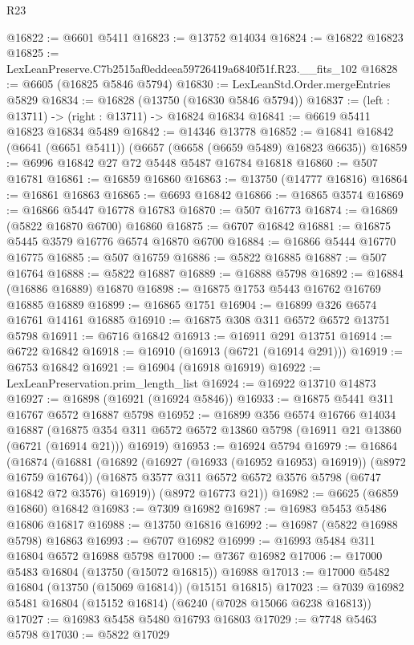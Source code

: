 \begin{lexlean}{R23}
\begin{coremodule}
@16822 := @6601 @5411
@16823 := @13752 @14034
@16824 := @16822 @16823
@16825 := LexLeanPreserve.C7b2515af0eddeea59726419a6840f51f.R23.__fits_102
@16828 := @6605 (@16825 @5846 @5794)
@16830 := LexLeanStd.Order.mergeEntries @5829
@16834 := @16828 (@13750 (@16830 @5846 @5794))
@16837 := (left : @13711) -> (right : @13711) -> @16824 @16834
@16841 := @6619 @5411 @16823 @16834 @5489
@16842 := @14346 @13778
@16852 := @16841 @16842 (@6641 (@6651 @5411)) (@6657 (@6658 (@6659 @5489) @16823 @6635))
@16859 := @6996 @16842 @27 @72 @5448 @5487 @16784 @16818
@16860 := @507 @16781
@16861 := @16859 @16860
@16863 := @13750 (@14777 @16816)
@16864 := @16861 @16863
@16865 := @6693 @16842
@16866 := @16865 @3574
@16869 := @16866 @5447 @16778 @16783
@16870 := @507 @16773
@16874 := @16869 (@5822 @16870 @6700) @16860
@16875 := @6707 @16842
@16881 := @16875 @5445 @3579 @16776 @6574 @16870 @6700
@16884 := @16866 @5444 @16770 @16775
@16885 := @507 @16759
@16886 := @5822 @16885
@16887 := @507 @16764
@16888 := @5822 @16887
@16889 := @16888 @5798
@16892 := @16884 (@16886 @16889) @16870
@16898 := @16875 @1753 @5443 @16762 @16769 @16885 @16889
@16899 := @16865 @1751
@16904 := @16899 @326 @6574 @16761 @14161 @16885
@16910 := @16875 @308 @311 @6572 @6572 @13751 @5798
@16911 := @6716 @16842
@16913 := @16911 @291 @13751
@16914 := @6722 @16842
@16918 := @16910 (@16913 (@6721 (@16914 @291)))
@16919 := @6753 @16842
@16921 := @16904 (@16918 @16919)
@16922 := LexLeanPreservation.prim_length_list
@16924 := @16922 @13710 @14873
@16927 := @16898 (@16921 (@16924 @5846))
@16933 := @16875 @5441 @311 @16767 @6572 @16887 @5798
@16952 := @16899
    @356
    @6574
    @16766
    @14034
    @16887
    (@16875 @354 @311 @6572 @6572 @13860 @5798 (@16911 @21 @13860 (@6721 (@16914 @21))) @16919)
@16953 := @16924 @5794
@16979 := @16864
    (@16874
      (@16881
        (@16892 (@16927 (@16933 (@16952 @16953) @16919)) (@8972 @16759 @16764))
        (@16875 @3577 @311 @6572 @6572 @3576 @5798 (@6747 @16842 @72 @3576) @16919))
      (@8972 @16773 @21))
@16982 := @6625 (@6859 @16860) @16842
@16983 := @7309 @16982
@16987 := @16983 @5453 @5486 @16806 @16817
@16988 := @13750 @16816
@16992 := @16987 (@5822 @16988 @5798) @16863
@16993 := @6707 @16982
@16999 := @16993 @5484 @311 @16804 @6572 @16988 @5798
@17000 := @7367 @16982
@17006 := @17000 @5483 @16804 (@13750 (@15072 @16815)) @16988
@17013 := @17000 @5482 @16804 (@13750 (@15069 @16814)) (@15151 @16815)
@17023 := @7039 @16982 @5481 @16804 (@15152 @16814) (@6240 (@7028 @15066 @6238 @16813))
@17027 := @16983 @5458 @5480 @16793 @16803
@17029 := @7748 @5463 @5798
@17030 := @5822 @17029

\end{coremodule}
\end{lexlean}
